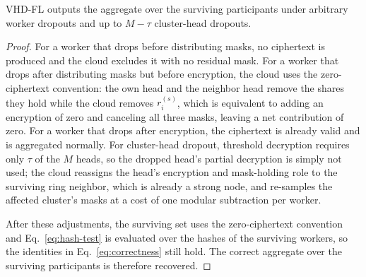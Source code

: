 \begin{theorem}
\label{thm:dropout}
\textsc{VHD-FL} outputs the aggregate over the surviving participants under arbitrary worker dropouts and up to $M-\tau$ cluster-head dropouts.
\end{theorem}
\begin{proof}
For a worker that drops before distributing masks, no ciphertext is produced and the cloud excludes it with no residual mask. For a worker that drops after distributing masks but before encryption, the cloud uses the zero-ciphertext convention: the own head and the neighbor head remove the shares they hold while the cloud removes $r_i^{(s)}$, which is equivalent to adding an encryption of zero and canceling all three masks, leaving a net contribution of zero. For a worker that drops after encryption, the ciphertext is already valid and is aggregated normally. For cluster-head dropout, threshold decryption requires only $\tau$ of the $M$ heads, so the dropped head's partial decryption is simply not used; the cloud reassigns the head's encryption and mask-holding role to the surviving ring neighbor, which is already a strong node, and re-samples the affected cluster's masks at a cost of one modular subtraction per worker.

After these adjustments, the surviving set uses the zero-ciphertext convention and Eq.~\eqref{eq:hash-test} is evaluated over the hashes of the surviving workers, so the identities in Eq.~\eqref{eq:correctness} still hold. The correct aggregate over the surviving participants is therefore recovered.
\end{proof}
